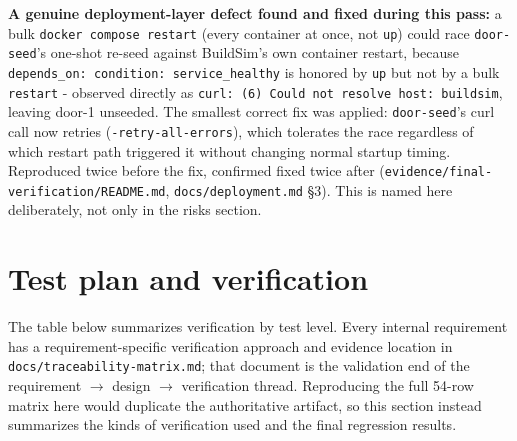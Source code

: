 \documentclass[11pt]{article}
\begin{document}
\textbf{A genuine deployment-layer defect found and fixed during this
pass:} a bulk \texttt{docker compose restart} (every container at once,
not \texttt{up}) could race \texttt{door-seed}'s one-shot re-seed against
BuildSim's own container restart, because \texttt{depends\_on: condition:
service\_healthy} is honored by \texttt{up} but not by a bulk
\texttt{restart} - observed directly as
\texttt{curl: (6) Could not resolve host: buildsim}, leaving door-1
unseeded. The smallest correct fix was applied: \texttt{door-seed}'s curl
call now retries (\texttt{-retry-all-errors}), which tolerates the race
regardless of which restart path triggered it without changing normal
startup timing. Reproduced twice before the fix, confirmed fixed twice
after (\texttt{evidence/final-verification/README.md},
\texttt{docs/deployment.md} \S3). This is named here deliberately, not
only in the risks section.

\section{Test plan and verification}
The table below summarizes verification by test level. Every internal
requirement has a requirement-specific verification approach and
evidence location in \texttt{docs/traceability-matrix.md}; that document
is the validation end of the requirement $\rightarrow$ design
$\rightarrow$ verification thread. Reproducing the full 54-row matrix
here would duplicate the authoritative artifact, so this section instead
summarizes the kinds of verification used and the final regression
results.

\label{sec:testplan}
\end{document}
